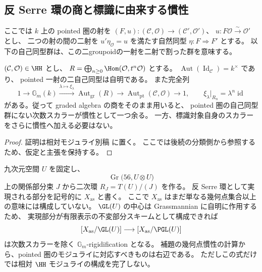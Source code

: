 \subsection{反 Serre 環の商と標識に由来する慣性}
\label{subsec:antiserre-stack-candidate}

ここでは $k$ 上の pointed 圏の射を
$(F,u):(\mathcal C,\mathcal O)\to(\mathcal C',\mathcal O')$、
$u:F\mathcal O\xrightarrow\sim\mathcal O'$ とし、
二つの射の間の二射を $u'\eta_{\mathcal O}=u$ を満たす自然同型
$\eta:F\Rightarrow F'$ とする。
以下の自己同型群は、この二groupoidの一射を二射で割った群を意味する。

\begin{lemma}[標識付き圏の二射と次数スカラー]
\label{lem:pointed-degree-scalar}
$(\mathcal C,\mathcal O)\in\HH$ とし、
$R=\bigoplus_{n\ge0}\Hom(\mathcal O,t^n\mathcal O)$ とする。
$\operatorname{Aut}(\operatorname{Id}_{\mathcal C})=k^\times$ であり、
pointed 一射の二自己同型は自明である。
また完全列
\[
 1\longrightarrow\mathbb G_m(k)
 \xrightarrow{\lambda\mapsto\xi_\lambda}
 \operatorname{Aut}_{\mathrm{gr}}(R)
 \longrightarrow
 \operatorname{Aut}_{\mathrm{pt}}(\mathcal C,\mathcal O)
 \longrightarrow1,
 \qquad \xi_\lambda|_{R_n}=\lambda^n\operatorname{id}
\]
がある。従って graded algebra の商をそのまま用いると、
pointed 圏の自己同型群にない次数スカラーが慣性として一つ余る。
一方、標識対象自身のスカラーをさらに慣性へ加える必要はない。
\end{lemma}

\begin{proof}
証明は相対モジュライ別稿 \cite[\texttt{foundation_stack} 節]{QuadricModuli2026} に置く。
ここでは後続の分類側から参照するため、仮定と主張を保持する。
\end{proof}

九次元空間 $U$ を固定し、
\[
 \operatorname{Gr}\bigl(56,U\otimes U\bigr)
\]
上の関係部分束 $J$ から二次環 $R_J=T(U)/(J)$ を作る。
反 Serre 環として実現される部分を記号的に $X_{\mathrm{as}}$ と書く。
ここで $X_{\mathrm{as}}$ はまだ単なる幾何点集合以上の意味には構成していない。
$\GL(U)$ の中心は Grassmannian に自明に作用するため、
実現部分が有限表示の不変部分スキームとして構成できれば
\[
 [X_{\mathrm{as}}/\GL(U)]\longrightarrow
 [X_{\mathrm{as}}/\PGL(U)]
\]
は次数スカラーを除く $\mathbb G_m$-rigidification となる。
補題の幾何点慣性の計算から、pointed 圏のモジュライに対応すべきものは右辺である。
ただしこの式だけでは相対 $\HH$ モジュライの構成を完了しない。

